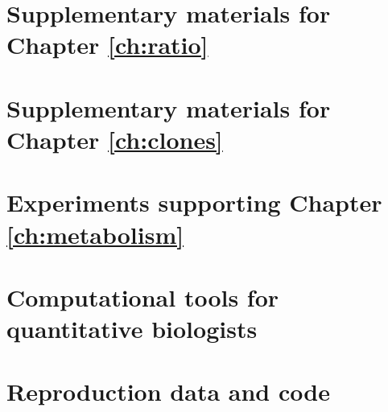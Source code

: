 \chapter{Supplementary materials for Chapter \ref{ch:ratio}}
\label{appendix:ratio}



\newpage

\chapter{Supplementary materials for Chapter \ref{ch:clones}}
\label{appendix:clones}



\newpage

\chapter{Experiments supporting Chapter \ref{ch:metabolism}}
\label{appendix:metabolism}

%

\newpage

\chapter{Computational tools for quantitative biologists}
\label{appendix:software}


\chapter{Reproduction data and code}
\label{appendix:data}

